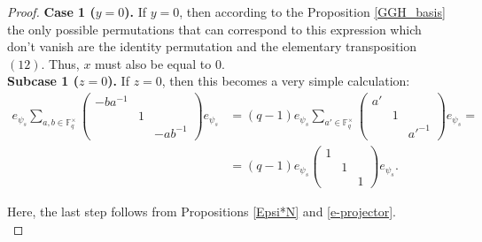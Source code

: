 \documentclass[12pt,reqno]{amsart}
\theoremstyle{definition}
\theoremstyle{remark}
\numberwithin{equation}{section}
\begin{document}
\begin{proof}
    \textbf{Case 1 ($y = 0$).} If $y = 0$, then according to the Proposition \ref{GGH_basis} the only possible permutations that can correspond to this expression which don't vanish are the identity permutation and the elementary transposition $(12)$. Thus, $x$ must also be equal to $0$.\\

    \textbf{Subcase 1 ($z = 0$).} If $z = 0$, then this becomes a very simple calculation:
    \begin{align*}
        e_{\psi_s} \sum_{a, b \in \mathbb{F}_q^\times} \begin{pmatrix}
            -ba^{-1} & & \\
            & 1 & \\
            & & -ab^{-1}
        \end{pmatrix} e_{\psi_s} &= (q-1) e_{\psi_s} \sum_{a' \in \mathbb{F}_q^\times} \begin{pmatrix}
            a' & & \\
            & 1 &\\
            & & a'^{-1}
        \end{pmatrix} e_{\psi_s}=\\
        &= (q-1)e_{\psi_s}\begin{pmatrix}
            1 & & \\
            & 1 & \\
            & & 1
        \end{pmatrix}e_{\psi_s}.
    \end{align*}

    Here, the last step follows from Propositions \ref{Epsi*N} and \ref{e-projector}.\\
    

\end{proof}
\end{document}
